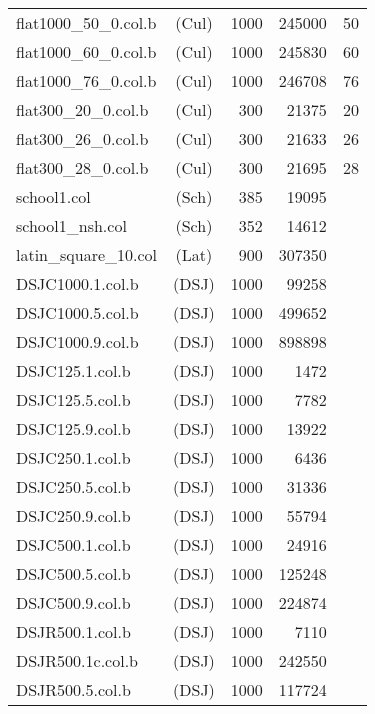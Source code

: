 \begin{supertabular}{|lc|rr|c|}
flat1000\_50\_0.col.b&(Cul)&1000&245000&50\\
flat1000\_60\_0.col.b&(Cul)&1000&245830&60\\
flat1000\_76\_0.col.b&(Cul)&1000&246708&76\\
flat300\_20\_0.col.b&(Cul)&300&21375&20\\
flat300\_26\_0.col.b&(Cul)&300&21633&26\\
flat300\_28\_0.col.b&(Cul)&300&21695&28\\
school1.col&(Sch)&385&19095& \\
school1\_nsh.col&(Sch)&352&14612& \\
latin\_square\_10.col&(Lat)&900&307350& \\
DSJC1000.1.col.b&(DSJ)&1000&99258 & \\
DSJC1000.5.col.b&(DSJ)&1000&499652 & \\
DSJC1000.9.col.b&(DSJ)&1000&898898 & \\
DSJC125.1.col.b&(DSJ)&1000&1472 & \\
DSJC125.5.col.b&(DSJ)&1000&7782 & \\
DSJC125.9.col.b&(DSJ)&1000&13922 & \\
DSJC250.1.col.b&(DSJ)&1000&6436 & \\
DSJC250.5.col.b&(DSJ)&1000&31336 & \\
DSJC250.9.col.b&(DSJ)&1000&55794 & \\
DSJC500.1.col.b&(DSJ)&1000&24916 & \\
DSJC500.5.col.b&(DSJ)&1000&125248 & \\
DSJC500.9.col.b&(DSJ)&1000&224874 & \\
DSJR500.1.col.b&(DSJ)&1000&7110 & \\
DSJR500.1c.col.b&(DSJ)&1000&242550 & \\
DSJR500.5.col.b&(DSJ)&1000&117724 & \\
\end{supertabular}
\bigskip
{}
